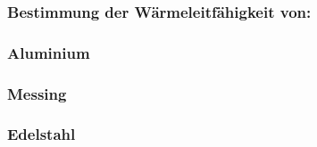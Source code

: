 \subsubsection{Bestimmung der Wärmeleitfähigkeit von:}

\subsubsection{Aluminium}



\subsubsection{Messing}

\subsubsection{Edelstahl}